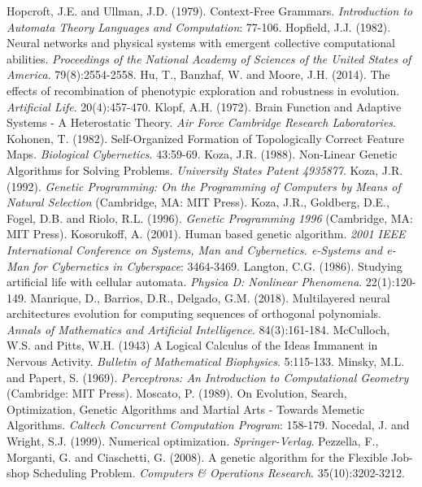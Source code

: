 \documentclass[spanish,a4paper,12pt,twoside]{report}
\begin{document}
\begin{thebibliography}{00}
   Hopcroft, J.E. and Ullman, J.D. (1979). Context-Free Grammars. \emph{Introduction to Automata Theory Languages and Computation}: 77-106.
   Hopfield, J.J. (1982). Neural networks and physical systems with emergent collective computational abilities. \emph{Proceedings of the National Academy of Sciences of the United States of America}. 79(8):2554-2558.
   Hu, T., Banzhaf, W. and Moore, J.H. (2014). The effects of recombination of phenotypic exploration and robustness in evolution. \emph{Artificial Life}. 20(4):457-470.
   Klopf, A.H. (1972). Brain Function and Adaptive Systems - A Heterostatic Theory. \emph{Air Force Cambridge Research Laboratories}.
   Kohonen, T. (1982). Self-Organized Formation of Topologically Correct Feature Maps. \emph{Biological Cybernetics}. 43:59-69.
   Koza, J.R. (1988). Non-Linear Genetic Algorithms for Solving Problems. \emph{University States Patent 4935877}.
   Koza, J.R.(1992). \emph{Genetic Programming: On the Programming of Computers by Means of Natural Selection}  (Cambridge, MA: MIT Press).
   Koza, J.R., Goldberg, D.E., Fogel, D.B. and Riolo, R.L. (1996). \emph{Genetic Programming 1996} (Cambridge, MA: MIT Press).
   Kosorukoff, A. (2001). Human based genetic algorithm. \emph{2001 IEEE International Conference on Systems, Man and Cybernetics. e-Systems and e-Man for Cybernetics in Cyberspace}: 3464-3469.
   Langton, C.G. (1986). Studying artificial life with cellular automata. \emph{Physica D: Nonlinear Phenomena}. 22(1):120-149.
   Manrique, D., Barrios, D.R., Delgado, G.M. (2018). Multilayered neural architectures evolution for computing sequences of orthogonal polynomials. \emph{Annals of Mathematics and Artificial Intelligence}. 84(3):161-184.
   McCulloch, W.S. and Pitts, W.H. (1943) A Logical Calculus of the Ideas Immanent in Nervous Activity. \emph{Bulletin of Mathematical Biophysics}. 5:115-133.
   Minsky, M.L. and Papert, S. (1969). \emph{Perceptrons: An Introduction to Computational Geometry} (Cambridge: MIT Press).
   Moscato, P. (1989). On Evolution, Search, Optimization, Genetic Algorithms and Martial Arts - Towards Memetic Algorithms. \emph{Caltech Concurrent Computation Program}: 158-179.
   Nocedal, J. and Wright, S.J. (1999). Numerical optimization. \emph{Springer-Verlag}.
   Pezzella, F., Morganti, G. and Ciaschetti, G. (2008). A genetic algorithm for the Flexible Job-shop Scheduling Problem. \emph{Computers \& Operations Research}. 35(10):3202-3212.

\end{thebibliography}
\end{document}
